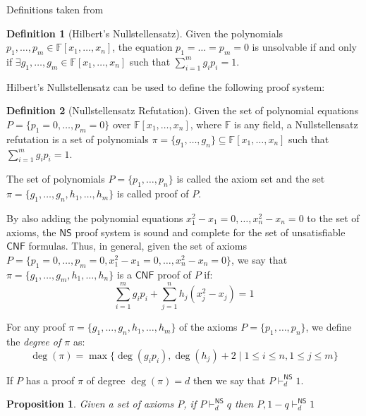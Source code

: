 \documentclass[12pt]{article}
\newtheorem{proposition}{Proposition}
\theoremstyle{definition}
\newtheorem{definition}{Definition}
\newcommand{\F}{\mathbb{F}}
\newcommand{\NS}{\mathsf{NS}}
\newcommand{\CNF}{\mathsf{CNF}}
\begin{document}
    Definitions taken from \cite{Nullstellensatz}

    \begin{definition}[Hilbert's Nullstellensatz]
        Given the polynomials $p_1, \ldots, p_m \in \F[x_1, \ldots, x_n]$, the equation $p_1 = \ldots = p_m = 0$ is unsolvable if and only if $\exists g_1, \ldots, g_m \in \F[x_1, \ldots, x_n]$ such that $\sum\limits_{i = 1}^m g_i p_i = 1$.
    \end{definition}

    Hilbert's Nullstellensatz can be used to define the following proof system:

    \begin{definition}[Nullstellensatz Refutation]
        Given the set of polynomial equations $P = \{p_1 = 0, \ldots, p_m = 0\}$ over $\F[x_1, \ldots, x_n]$, where $\F$ is any field, a Nullstellensatz refutation is a set of polynomials $\pi = \{g_1, \ldots, g_n\} \subseteq \F[x_1, \ldots, x_n]$ such that $\sum\limits_{i = 1}^m g_i p_i = 1$.

        The set of polynomials $P = \{p_1, \ldots, p_n\}$ is called the axiom set and the set $\pi = \{g_1, \ldots, g_n, h_1, \ldots, h_m\}$ is called proof of $P$.
    \end{definition}

    By also adding the polynomial equations $x_1^2-x_1 = 0, \ldots, x_n^2-x_n = 0$ to the set of axioms, the $\NS$ proof system is sound and complete for the set of unsatisfiable $\CNF$ formulas. Thus, in general, given the set of axioms $P = \{p_1 = 0, \ldots, p_m = 0, x_1^2-x_1 = 0, \ldots, x_n^2-x_n = 0\}$, we say that $\pi = \{g_1, \ldots, g_m, h_1, \ldots, h_n\}$ is a $\CNF$ proof of $P$ if:
    \[\sum_{i = 1}^m g_i p_i + \sum_{j = 1}^n h_j (x_j^2-x_j) = 1\]
    
    For any proof $\pi = \{g_1, \ldots, g_n, h_1, \ldots, h_m\}$ of the axioms $P = \{p_1, \ldots, p_n\}$, we define the \textit{degree of $\pi$} as:
    \[\deg(\pi) = \max\{\deg(g_i p_i), \deg(h_j) + 2 \mid 1 \leq i \leq n, 1 \leq j \leq m\}\]

    If $P$ has a proof $\pi$ of degree $\deg(\pi) = d$ then we say that $P \vdash^\NS_d 1$.
    
    \begin{proposition}
        \label{neg_refutation}
        Given a set of axioms $P$, if $P \vdash^\NS_d q$ then $P, 1-q \vdash^\NS_d 1$ 
    \end{proposition}
\end{document}
